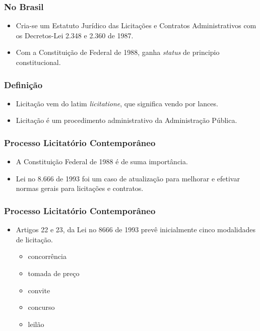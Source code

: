 \documentclass{beamer}
\begin{document}
		\begin{frame} \frametitle{No Brasil}
			\begin{itemize}
				\item Cria-se um Estatuto Jurídico das Licitações e Contratos Administrativos com os Decretos-Lei 2.348 e 2.360 de 1987.
				\item Com a Constituição de Federal de 1988, ganha \textit{status} de principio constitucional.
			\end{itemize}
		\end{frame}	
	
		\begin{frame} \frametitle{Definição}
			\begin{itemize}
				\item Licitação vem do latim \textit{licitatione}, que significa vendo por lances.
				\item Licitação é um procedimento administrativo da Administração Pública.
			\end{itemize}
		\end{frame}	
	
		\begin{frame} \frametitle{Processo Licitatório Contemporâneo}
			\begin{itemize}
				\item A Constituição Federal de 1988 é de suma importância.
				\item Lei no 8.666 de 1993 foi um caso de atualização para melhorar e efetivar normas gerais para licitações e contratos.
			\end{itemize}
		\end{frame}		
	
		\begin{frame} \frametitle{Processo Licitatório Contemporâneo}
			\begin{itemize}
				\item Artigos 22 e 23, da Lei no 8666 de 1993 prevê inicialmente cinco modalidades de licitação.
				\begin{itemize}
					\item concorrência
					\item tomada de preço
					\item convite
					\item concurso
					\item leilão
				\end{itemize}
			\end{itemize}
		\end{frame}		
	
\end{document}
